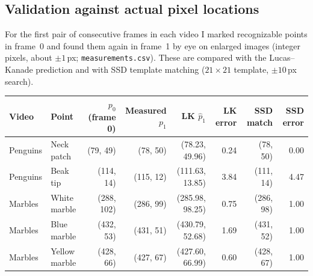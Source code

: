 \documentclass[10pt,letterpaper]{article}
\begin{document}
\subsection{Validation against actual pixel locations}
For the first pair of consecutive frames in each video I marked recognizable points in
frame~0 and found them again in frame~1 by eye on enlarged images (integer pixels, about
$\pm1$\,px; \texttt{measurements.csv}). These are compared with the Lucas--Kanade prediction
and with SSD template matching ($21\times21$ template, $\pm10$\,px search).

\begin{table}[H]\centering\small
\begin{tabular}{llrrrrrr}\toprule
Video & Point & $p_0$ (frame 0) & Measured $p_1$ & LK $\hat p_1$ & LK error & SSD match & SSD error\\\midrule
Penguins & Neck patch   & (79, 49)  & (78, 50)  & (78.23, 49.96)  & 0.24 & (78, 50) & 0.00\\
Penguins & Beak tip     & (114, 14) & (115, 12) & (111.63, 13.85) & 3.84 & (111, 14) & 4.47\\
Marbles  & White marble & (288, 102)& (286, 99) & (285.98, 98.25) & 0.75 & (286, 98) & 1.00\\
Marbles  & Blue marble  & (432, 53) & (431, 51) & (430.79, 52.68) & 1.69 & (431, 52) & 1.00\\
Marbles  & Yellow marble& (428, 66) & (427, 67) & (427.60, 66.99) & 0.60 & (428, 67) & 1.00\\\bottomrule
\end{tabular}
\end{table}
\end{document}
